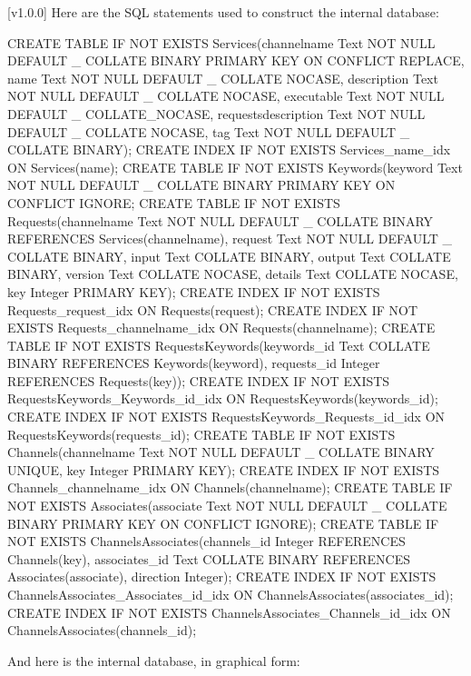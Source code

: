 [v1.0.0]
Here are the SQL statements used to construct the internal database:
\outputBegin
\begin{listing}[5]{1}
CREATE TABLE IF NOT EXISTS Services(channelname Text NOT NULL DEFAULT _
           COLLATE BINARY PRIMARY KEY ON CONFLICT REPLACE,
       name Text NOT NULL DEFAULT _ COLLATE NOCASE,
       description Text NOT NULL DEFAULT _ COLLATE NOCASE,
       executable Text NOT NULL DEFAULT _ COLLATE_NOCASE,
       requestsdescription Text NOT NULL DEFAULT _ COLLATE NOCASE,
       tag Text NOT NULL DEFAULT _  COLLATE BINARY);
CREATE INDEX IF NOT EXISTS Services_name_idx ON Services(name);
CREATE TABLE IF NOT EXISTS Keywords(keyword Text NOT NULL DEFAULT _
           COLLATE BINARY PRIMARY KEY ON CONFLICT IGNORE;
CREATE TABLE IF NOT EXISTS Requests(channelname Text NOT NULL DEFAULT _
           COLLATE BINARY REFERENCES Services(channelname),
       request Text NOT NULL DEFAULT _ COLLATE BINARY,
       input Text COLLATE BINARY,
       output Text COLLATE BINARY,
       version Text COLLATE NOCASE,
       details Text COLLATE NOCASE,
       key Integer PRIMARY KEY);
CREATE INDEX IF NOT EXISTS Requests_request_idx ON Requests(request);
CREATE INDEX IF NOT EXISTS Requests_channelname_idx ON Requests(channelname);
CREATE TABLE IF NOT EXISTS RequestsKeywords(keywords_id Text COLLATE BINARY
           REFERENCES Keywords(keyword),
       requests_id Integer REFERENCES Requests(key));
CREATE INDEX IF NOT EXISTS RequestsKeywords_Keywords_id_idx ON
       RequestsKeywords(keywords_id);
CREATE INDEX IF NOT EXISTS RequestsKeywords_Requests_id_idx ON
       RequestsKeywords(requests_id);
CREATE TABLE IF NOT EXISTS Channels(channelname Text NOT NULL DEFAULT _
           COLLATE BINARY UNIQUE,
       key Integer PRIMARY KEY);
CREATE INDEX IF NOT EXISTS Channels_channelname_idx ON Channels(channelname);
CREATE TABLE IF NOT EXISTS Associates(associate Text NOT NULL DEFAULT _
           COLLATE BINARY PRIMARY KEY ON CONFLICT IGNORE);
CREATE TABLE IF NOT EXISTS ChannelsAssociates(channels_id Integer
           REFERENCES Channels(key),
       associates_id Text COLLATE BINARY REFERENCES Associates(associate),
       direction Integer);
CREATE INDEX IF NOT EXISTS ChannelsAssociates_Associates_id_idx ON
       ChannelsAssociates(associates_id);
CREATE INDEX IF NOT EXISTS ChannelsAssociates_Channels_id_idx ON
       ChannelsAssociates(channels_id);
\end{listing}
\outputEnd
\condPage{}
And here is the internal database, in graphical form:\\
\appendixEnd{}
